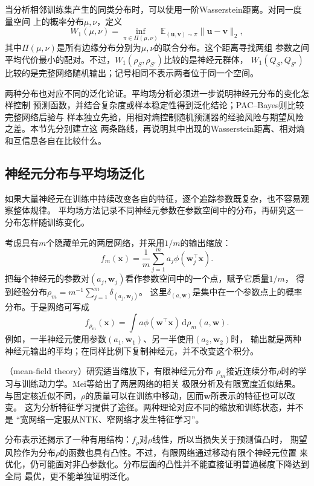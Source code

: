 当分析相邻训练集产生的同类分布时，可以使用一阶Wasserstein距离。对同一度量空间
上的概率分布$\mu,\nu$，定义
\[
 W_1(\mu,\nu)=\inf_{\pi\in\Pi(\mu,\nu)}
 \mathbb E_{(\bm u,\bm v)\sim\pi}\|\bm u-\bm v\|_2,
\]
其中$\Pi(\mu,\nu)$是所有边缘分布分别为$\mu,\nu$的联合分布。这个距离寻找两组
参数之间平均代价最小的配对。不过，$W_1(\rho_S,\rho_{S'})$比较的是神经元群体，
$W_1(Q_S,Q_{S'})$比较的是完整网络随机输出；记号相同不表示两者位于同一个空间。

两种分布也对应不同的泛化论证。平均场分析必须进一步说明神经元分布的变化怎样控制
预测函数，并结合复杂度或样本稳定性得到泛化结论；PAC--Bayes则比较完整网络后验与
样本独立先验，用相对熵控制随机预测器的经验风险与期望风险之差。本节先分别建立这
两条路线，再说明其中出现的Wasserstein距离、相对熵和互信息各自在比较什么。

\subsection{神经元分布与平均场泛化}

如果大量神经元在训练中持续改变各自的特征，逐个追踪参数既复杂，也不容易观察整体规律。
平均场方法记录不同神经元参数在参数空间中的分布，再研究这一分布怎样随训练变化。

考虑具有$m$个隐藏单元的两层网络，并采用$1/m$的输出缩放：
\[
 f_m(\bm x)=\frac1m\sum_{j=1}^m a_j\phi(\bm w_j^\top\bm x).
\]
把每个神经元的参数对$(a_j,\bm w_j)$看作参数空间中的一个点，赋予它质量$1/m$，
得到经验分布$\rho_m=m^{-1}\sum_{j=1}^m\delta_{(a_j,\bm w_j)}$。
这里$\delta_{(a,\bm w)}$是集中在一个参数点上的概率分布。于是网络可写成
\begin{equation}
 f_{\rho_m}(\bm x)=\int a\phi(\bm w^\top\bm x)\,\mathrm d\rho_m(a,\bm w).
 \label{eq:mean-field-network}
\end{equation}
例如，一半神经元使用参数$(a_1,\bm w_1)$、另一半使用$(a_2,\bm w_2)$时，
输出就是两种神经元输出的平均；在同样比例下复制神经元，并不改变这个积分。

（mean-field theory）研究适当缩放下，有限神经元分布
$\rho_m$接近连续分布$\rho$时的学习与训练动力学。Mei等给出了两层网络的相关
极限分析及有限宽度近似结果。
与固定核近似不同，$\rho$的质量可以在训练中移动，因而$\bm w$所表示的特征也可以改变。
这为分析特征学习提供了途径。两种理论对应不同的缩放和训练状态，并不是
“宽网络一定服从NTK、窄网络才发生特征学习”。

分布表示还揭示了一种有用结构：$f_\rho$对$\rho$线性，所以当损失关于预测值凸时，
期望风险作为分布$\rho$的函数也具有凸性。不过，有限网络通过移动有限个神经元位置
来优化，仍可能面对非凸参数化。分布层面的凸性并不能直接证明普通梯度下降达到全局
最优，更不能单独证明泛化。

